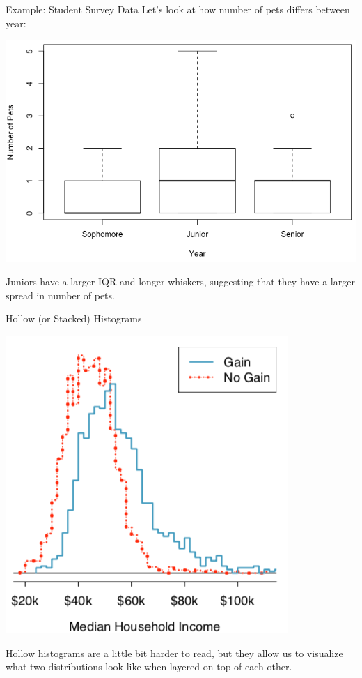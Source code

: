 \begin{frame}{Example: Student Survey Data}
    Let's look at how number of pets differs between year: 
    \begin{center}
        \includegraphics[scale=0.3]{images/petsyearbox.png}
    \end{center}
    Juniors have a larger IQR and longer whiskers, suggesting that they have a larger spread in number of pets.
\end{frame}

\begin{frame}{Hollow (or Stacked) Histograms}
    \begin{center}
        \includegraphics[scale=0.33]{images/hollowhists.png}
    \end{center}
    Hollow histograms are a little bit harder to read, but they allow us to visualize what two distributions look like when layered on top of each other.
\end{frame}
